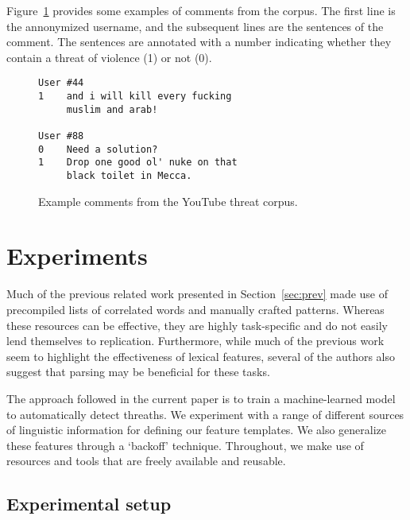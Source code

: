 \documentclass[11pt,letterpaper]{article}
\newcommand{\tov}{threat of violence}
\begin{document}
Figure~\ref{fig:comments} provides some examples of comments from the corpus. The first line is the annonymized username, and the subsequent lines are the sentences of the comment. %
The sentences are annotated with a number indicating whether they contain a \tov{} (1) or not (0).

\begin{figure}
\begin{Verbatim}[fontsize=\small]
User #44
1    and i will kill every fucking
     muslim and arab!

User #88
0    Need a solution?
1    Drop one good ol' nuke on that
     black toilet in Mecca.
\end{Verbatim}
\caption{Example comments from the YouTube threat corpus.}
\label{fig:comments}
\end{figure}

\section{Experiments}
\label{sec:exp}
Much of the previous related work presented in Section~\ref{sec:prev} made use of precompiled lists of correlated words and manually crafted patterns. Whereas these resources can be effective, they are highly task-specific and do not easily lend themselves to replication. Furthermore, while much of the previous work seem to highlight the effectiveness of lexical features, several of the authors also suggest that parsing may be beneficial for these tasks.

The approach followed in the current paper is to train a machine-learned model to automatically detect threaths. We experiment with a range of different sources of linguistic information for defining our feature templates. 
We also generalize these features through a `backoff' technique. Throughout, we make use of resources and tools that are freely available and reusable.


\subsection{Experimental setup}
\end{document}
